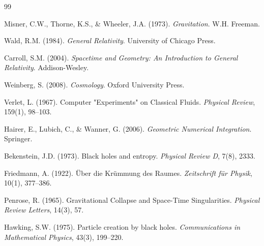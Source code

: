 \documentclass[12pt, a4paper]{article}
\begin{document}
\begin{thebibliography}{99}

 Misner, C.W., Thorne, K.S., \& Wheeler, J.A. (1973).
    \textit{Gravitation}. W.H. Freeman.

 Wald, R.M. (1984).
    \textit{General Relativity}. University of Chicago Press.

 Carroll, S.M. (2004).
    \textit{Spacetime and Geometry: An Introduction to General Relativity}.
    Addison-Wesley.

 Weinberg, S. (2008).
    \textit{Cosmology}. Oxford University Press.

 Verlet, L. (1967).
    Computer "Experiments" on Classical Fluids.
    \textit{Physical Review}, 159(1), 98--103.

 Hairer, E., Lubich, C., \& Wanner, G. (2006).
    \textit{Geometric Numerical Integration}. Springer.

 Bekenstein, J.D. (1973).
    Black holes and entropy. \textit{Physical Review D}, 7(8), 2333.

 Friedmann, A. (1922).
    Über die Krümmung des Raumes.
    \textit{Zeitschrift für Physik}, 10(1), 377--386.

 Penrose, R. (1965).
    Gravitational Collapse and Space-Time Singularities.
    \textit{Physical Review Letters}, 14(3), 57.

 Hawking, S.W. (1975).
    Particle creation by black holes.
    \textit{Communications in Mathematical Physics}, 43(3), 199--220.

\end{thebibliography}
\end{document}
